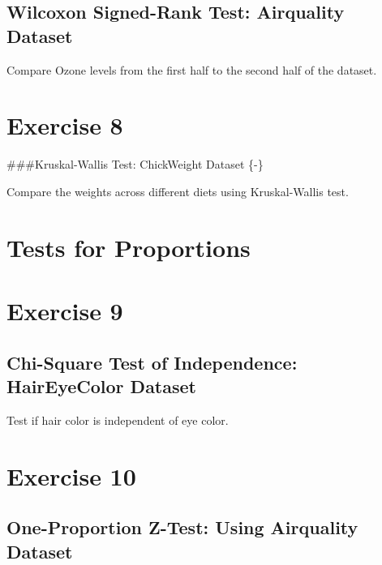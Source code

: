 \documentclass[
]{book}
\begin{document}
\subsection*{Wilcoxon Signed-Rank Test: Airquality Dataset}\label{wilcoxon-signed-rank-test-airquality-dataset}

Compare Ozone levels from the first half to the second half of the dataset.

\section*{Exercise 8}\label{exercise-8}

\#\#\#Kruskal-Wallis Test: ChickWeight Dataset \{-\}

Compare the weights across different diets using Kruskal-Wallis test.

\section{Tests for Proportions}\label{tests-for-proportions}

\section*{Exercise 9}\label{exercise-9}

\subsection{Chi-Square Test of Independence: HairEyeColor Dataset}\label{chi-square-test-of-independence-haireyecolor-dataset}

Test if hair color is independent of eye color.

\section*{Exercise 10}\label{exercise-10}

\subsection*{One-Proportion Z-Test: Using Airquality Dataset}\label{one-proportion-z-test-using-airquality-dataset}
\end{document}
